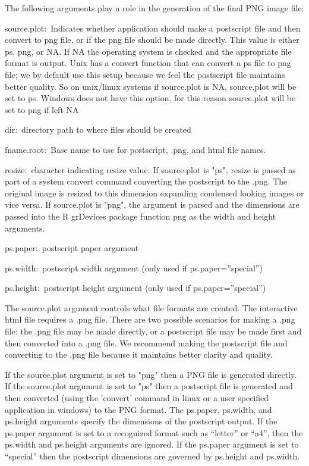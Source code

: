 \documentclass[]{article}
\begin{document}
The following arguments play a role in the generation of the final PNG image file:
\begin{description}
  \item{source.plot:~}{Indicates whether application should make a
    postscript file and then convert to png file, or if the png file
    should be made directly. This value is either ps, png, or NA. If NA
    the operating system is checked and the appropriate file format is
    output. Unix has a convert function that can convert a ps file to
    png file; we by default use this setup because we feel the
    postscript file maintains better quality. So on unix/linux systems
    if source.plot is NA, source.plot will be set to ps. Windows does
    not have this option, for this reason source.plot will be set to png
    if left NA}

  \item{dir:~}{directory path to where files should be created}
  \item{fname.root:~}{Base name to use for postscript, .png, and html
    file names.}

  \item{resize:~}{character indicating resize value. If source.plot is "ps", resize is passed as part of a system convert command converting the postscript to the .png. The original image is resized to this dimension expanding condensed looking images or vice versa. If source.plot is "png", the argument is parsed and the dimensions are passed into the R grDevices package function png as the width and height arguments.}
  \item{ps.paper:~}{postscript paper argument}
  \item{ps.width:~}{postscript width argument (only used if ps.paper=''special'')}
  \item{ps.height:~}{postscript height argument (only used if ps.paper=''special'')}


\end{description}
The source.plot argument controls what file formats are created. The interactive html file requires a .png file. There are two possible scenarios for making a .png file: the .png file may be made directly, or a postscript file may be made first and then converted into a .png file. We recommend making the postscript file and converting to the .png file because it maintains better clarity and quality.


\indent If the source.plot argument is set to "png" then a PNG file is generated directly. If the source.plot argument is set to "ps" then a postscript file is generated and then converted (using the 'convert' command in linux or a user specified application in windows) to the PNG format. The ps.paper, ps.width, and ps.height arguments specify the dimensions of the postscript output. If the ps.paper argument is set to a recognized format such as ``letter'' or ``a4'', then the ps.width and ps.height arguments are ignored. If the ps.paper argument is set to ``special'' then the postscript dimensions are governed by ps.height and ps.width. 
\end{document}
